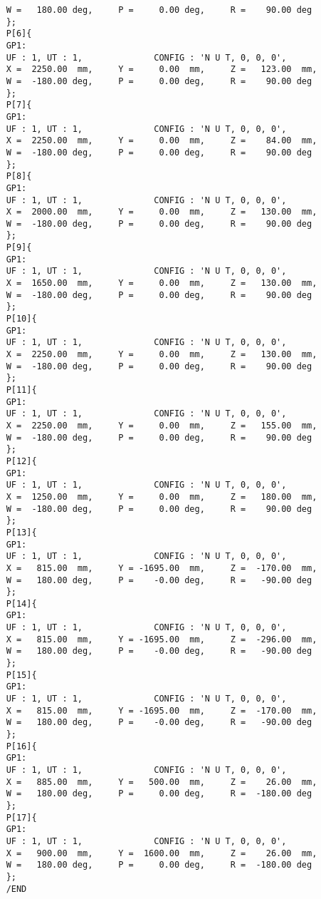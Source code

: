\begin{lstlisting}
	W =   180.00 deg,     P =     0.00 deg,     R =    90.00 deg
	};
	P[6]{ 
	GP1:
	UF : 1, UT : 1,              CONFIG : 'N U T, 0, 0, 0',
	X =  2250.00  mm,     Y =     0.00  mm,     Z =   123.00  mm,
	W =  -180.00 deg,     P =     0.00 deg,     R =    90.00 deg
	};
	P[7]{ 
	GP1:
	UF : 1, UT : 1,              CONFIG : 'N U T, 0, 0, 0',
	X =  2250.00  mm,     Y =     0.00  mm,     Z =    84.00  mm,
	W =  -180.00 deg,     P =     0.00 deg,     R =    90.00 deg
	};
	P[8]{ 
	GP1:
	UF : 1, UT : 1,              CONFIG : 'N U T, 0, 0, 0',
	X =  2000.00  mm,     Y =     0.00  mm,     Z =   130.00  mm,
	W =  -180.00 deg,     P =     0.00 deg,     R =    90.00 deg
	};
	P[9]{ 
	GP1:
	UF : 1, UT : 1,              CONFIG : 'N U T, 0, 0, 0',
	X =  1650.00  mm,     Y =     0.00  mm,     Z =   130.00  mm,
	W =  -180.00 deg,     P =     0.00 deg,     R =    90.00 deg
	};
	P[10]{ 
	GP1:
	UF : 1, UT : 1,              CONFIG : 'N U T, 0, 0, 0',
	X =  2250.00  mm,     Y =     0.00  mm,     Z =   130.00  mm,
	W =  -180.00 deg,     P =     0.00 deg,     R =    90.00 deg
	};
	P[11]{ 
	GP1:
	UF : 1, UT : 1,              CONFIG : 'N U T, 0, 0, 0',
	X =  2250.00  mm,     Y =     0.00  mm,     Z =   155.00  mm,
	W =  -180.00 deg,     P =     0.00 deg,     R =    90.00 deg
	};
	P[12]{ 
	GP1:
	UF : 1, UT : 1,              CONFIG : 'N U T, 0, 0, 0',
	X =  1250.00  mm,     Y =     0.00  mm,     Z =   180.00  mm,
	W =  -180.00 deg,     P =     0.00 deg,     R =    90.00 deg
	};
	P[13]{ 
	GP1:
	UF : 1, UT : 1,              CONFIG : 'N U T, 0, 0, 0',
	X =   815.00  mm,     Y = -1695.00  mm,     Z =  -170.00  mm,
	W =   180.00 deg,     P =    -0.00 deg,     R =   -90.00 deg
	};
	P[14]{ 
	GP1:
	UF : 1, UT : 1,              CONFIG : 'N U T, 0, 0, 0',
	X =   815.00  mm,     Y = -1695.00  mm,     Z =  -296.00  mm,
	W =   180.00 deg,     P =    -0.00 deg,     R =   -90.00 deg
	};
	P[15]{ 
	GP1:
	UF : 1, UT : 1,              CONFIG : 'N U T, 0, 0, 0',
	X =   815.00  mm,     Y = -1695.00  mm,     Z =  -170.00  mm,
	W =   180.00 deg,     P =    -0.00 deg,     R =   -90.00 deg
	};
	P[16]{ 
	GP1:
	UF : 1, UT : 1,              CONFIG : 'N U T, 0, 0, 0',
	X =   885.00  mm,     Y =   500.00  mm,     Z =    26.00  mm,
	W =   180.00 deg,     P =     0.00 deg,     R =  -180.00 deg
	};
	P[17]{ 
	GP1:
	UF : 1, UT : 1,              CONFIG : 'N U T, 0, 0, 0',
	X =   900.00  mm,     Y =  1600.00  mm,     Z =    26.00  mm,
	W =   180.00 deg,     P =     0.00 deg,     R =  -180.00 deg
	};
	/END
	
\end{lstlisting}